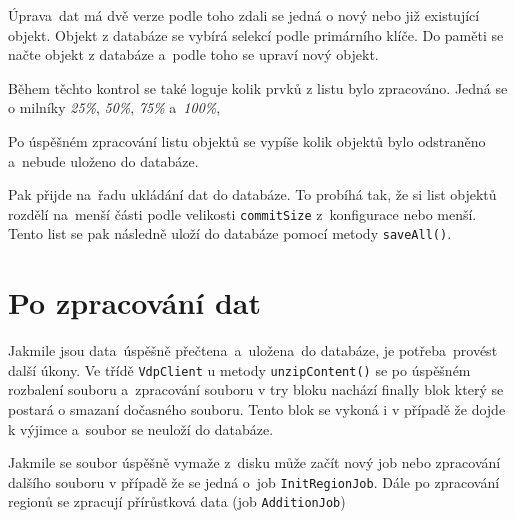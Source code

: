 Úprava~dat má dvě verze podle toho zdali se jedná o nový nebo již existující objekt.
Objekt z databáze se vybírá selekcí podle primárního klíče.
Do paměti se načte objekt z databáze a~podle toho se upraví nový objekt.

Během těchto kontrol se také loguje kolik prvků z listu bylo zpracováno.
Jedná se o milníky \textit{25\%}, \textit{50\%}, \textit{75\%} a~\textit{100\%}, 

Po úspěšném zpracování listu objektů se vypíše kolik objektů bylo odstraněno a~nebude uloženo do databáze.

Pak přijde na~řadu ukládání dat do databáze.
To probíhá tak, že si list objektů rozdělí na~menší části podle velikosti \texttt{commitSize} z~konfigurace nebo menší.
Tento list se pak následně uloží do databáze pomocí metody \texttt{saveAll()}.

\section{Po zpracování dat}
Jakmile jsou data~úspěšně přečtena~a~uložena~do databáze, je potřeba~provést další úkony.
Ve třídě \texttt{VdpClient} u metody \texttt{unzipContent()} se po úspěšném rozbalení souboru 
a~zpracování souboru v try bloku nachází finally blok který se postará o smazaní dočasného souboru.
Tento blok se vykoná i v případě že dojde k výjimce a~soubor se neuloží do databáze.

Jakmile se soubor úspěšně vymaže z~disku může začít nový job nebo zpracování dalšího souboru
v případě že se jedná o~job \texttt{InitRegionJob}. 
Dále po zpracování regionů se zpracují přírůstková data (job \texttt{AdditionJob})